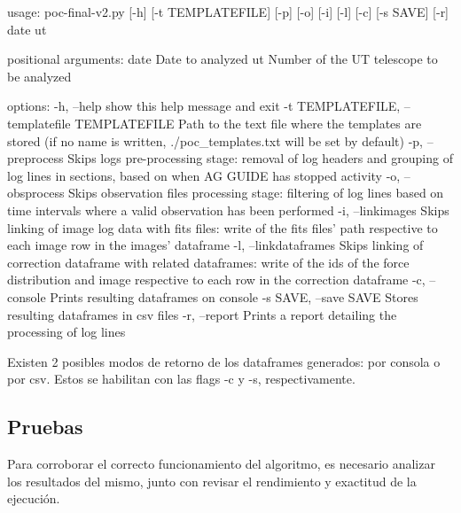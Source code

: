 \begin{myverbatim}[caption={Flags del codigo},label={myverbatim:flags}]
usage: poc-final-v2.py [-h] [-t TEMPLATEFILE] 
[-p] [-o] [-i] [-l] [-c] [-s SAVE] [-r] date ut

positional arguments:
  date              Date to analyzed
  ut                Number of the UT telescope to be analyzed

options:
  -h, --help        show this help message and exit
  -t TEMPLATEFILE, --templatefile TEMPLATEFILE
                    Path to the text file where the templates
                    are stored (if no name is written, 
                    ./poc_templates.txt
                    will be set by default)
  -p, --preprocess  Skips logs pre-processing stage: removal
                    of log headers and grouping of log 
                    lines in sections, based on when 
                    AG GUIDE has stopped activity
  -o, --obsprocess  Skips observation files processing stage: 
                    filtering of log lines based on time 
                    intervals where a valid observation has 
                    been performed
  -i, --linkimages  Skips linking of image log data with 
                    fits files: write of the fits files' 
                    path respective to each image row 
                    in the images' dataframe
  -l, --linkdataframes  Skips linking of correction 
                        dataframe with related dataframes: 
                        write of the ids of the force 
                        distribution and image respective 
                        to each row in the correction 
                        dataframe
  -c, --console     Prints resulting dataframes on console
  -s SAVE, --save SAVE Stores resulting dataframes in 
                        csv files
  -r, --report      Prints a report detailing the processing 
                    of log lines
\end{myverbatim}

Existen 2 posibles modos de retorno de los dataframes generados: por consola o por csv. Estos se habilitan con las flags -c y -s, respectivamente.

\subsection{Pruebas}

Para corroborar el correcto funcionamiento del algoritmo, es necesario analizar los resultados del mismo, junto con revisar el rendimiento y exactitud de la ejecución.


